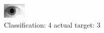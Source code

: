 \begin{figure}[h!]
\begin{center}
\includegraphics[width=0.60\columnwidth]{figures/ID1883_class_4_target_3.png}
\end{center}
\caption{ Classification: 4 actual target: 3}
\label{fig:ID1883_class_4_target_3}
\end{figure}
